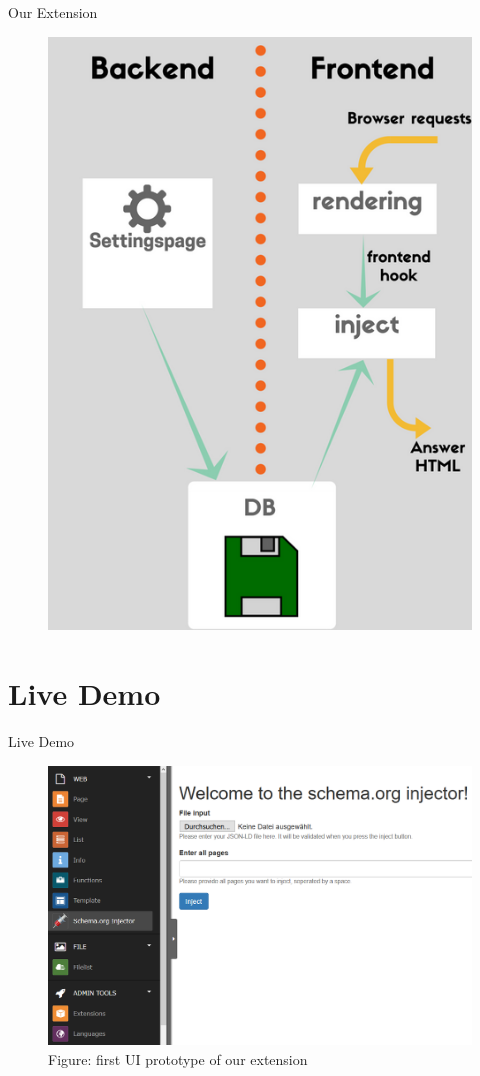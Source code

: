 \documentclass{beamer}
\begin{document}
\begin{frame}{Our Extension}

\begin{figure}[ht]
\centering
\includegraphics[height=0.75\textwidth]{work_flow.png}
\end{figure}
\end{frame}

\section{Live Demo}

\begin{frame}{Live Demo}
\begin{figure}[ht]
\centering
\includegraphics[width=1.0\textwidth]{screenshot2.png}
\caption{Figure: first UI prototype of our extension}
\end{figure}
\end{frame}
\end{document}
